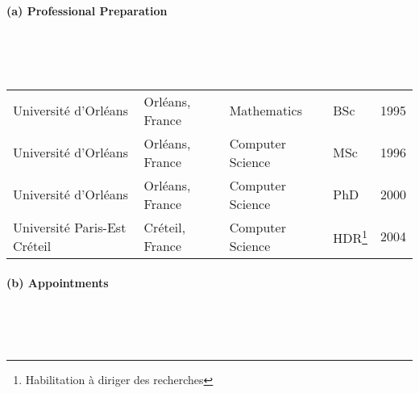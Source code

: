 \documentclass[11pt]{article}
\begin{document}

\paragraph{(a) Professional Preparation} ~

~

\begin{tabular}{lllll}
Université d'Orléans& Orléans, France& Mathematics     & BSc& 1995 \\[3pt]
Université d'Orléans& Orléans, France& Computer Science& MSc& 1996 \\[3pt]
Université d'Orléans& Orléans, France& Computer Science& PhD& 2000 \\[3pt]
Université Paris-Est Créteil& Créteil, France& Computer Science& HDR\footnote{Habilitation à diriger
                                                                                                                                                 des recherches} & 2004
\end{tabular} 





\paragraph{(b) Appointments} ~

~
\end{document}
